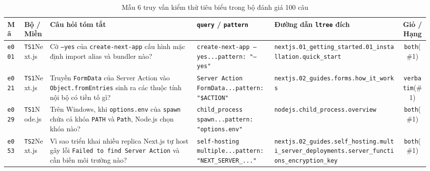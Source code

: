 \begin{table}[H]
\centering
\caption{Mẫu 6 truy vấn kiểm thử tiêu biểu trong bộ đánh giá 100 câu}
\label{tab:sample_queries}
\scriptsize\setlength{\tabcolsep}{3.5pt}\begin{tabularx}{\textwidth}{ll>{\raggedright\arraybackslash}X>{\raggedright\arraybackslash}p{3.0cm}>{\raggedright\arraybackslash}p{3.9cm}c}
\toprule
\textbf{Mã} & \textbf{Bộ / Miền} & \textbf{Câu hỏi tóm tắt} & \textbf{\texttt{query} / \texttt{pattern}} & \textbf{Đường dẫn \texttt{ltree} đích} & \textbf{Giỏ / Hạng} \\
\midrule
\texttt{e001} & \texttt{TS1}\newline Next.js & Cờ \texttt{--yes} của \texttt{create-next-app} cấu hình mặc định import alias và bundler nào? & \texttt{create-next-app --yes...}\newline\texttt{pattern: "--yes"} & \nolinkurl{nextjs.01_getting_started.01_installation.quick_start} & \texttt{both}\newline (\#1) \\
\addlinespace[2pt]
\texttt{e021} & \texttt{TS1}\newline Next.js & Truyền \texttt{FormData} của Server Action vào \texttt{Object.fromEntries} sinh ra các thuộc tính nội bộ có tiền tố gì? & \texttt{Server Action FormData...}\newline\texttt{pattern: "\$ACTION"} & \nolinkurl{nextjs.02_guides.forms.how_it_works} & \texttt{verbatim}\newline (\#1) \\
\addlinespace[2pt]
\texttt{e029} & \texttt{TS1}\newline Node.js & Trên Windows, khi \texttt{options.env} của \texttt{spawn} chứa cả khóa \texttt{PATH} và \texttt{Path}, Node.js chọn khóa nào? & \texttt{child\_process spawn...}\newline\texttt{pattern: "options.env"} & \nolinkurl{nodejs.child_process.overview} & \texttt{both}\newline (\#1) \\
\addlinespace[2pt]
\texttt{e053} & \texttt{TS2}\newline Next.js & Vì sao triển khai nhiều replica Next.js tự host gây lỗi \texttt{Failed to find Server Action} và cần biến môi trường nào? & \texttt{self-hosting multiple...}\newline\texttt{pattern: "NEXT\_SERVER\_..."} & \nolinkurl{nextjs.02_guides.self_hosting.multi_server_deployments.server_functions_encryption_key} & \texttt{both}\newline (\#1) \\

\end{tabularx}
\end{table}
